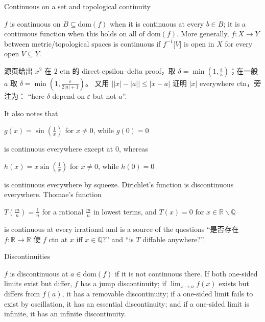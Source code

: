 \begin{definition}{Continuous on a set and topological continuity}

\(f\) is continuous on \(B \subseteq \text{dom}(f)\) when it is continuous at every \(b \in B\); it is a continuous function when this holds on all of \(\text{dom}(f)\). More generally, \(f:X\rightarrow Y\) between metric/topological spaces is continuous if \(f^{- 1}\lbrack V\rbrack\) is open in \(X\) for every open \(V \subseteq Y\).

\end{definition}

源页给出 \(x^{2}\) 在 \(2\) ctn 的 direct epsilon--delta proof，取 \(\delta = \min\left( {1,\frac{\varepsilon}{5}} \right)\)；在一般 \(a\) 取 \(\delta = \min\left( {1,\frac{\varepsilon}{2|a| + 1}} \right)\)。 又用 \(\left| {|x| - |a|} \right| \leq \left| {x - a} \right|\) 证明 \(|x|\) everywhere ctn，旁注为： ``here \(\delta\) depend on \(\varepsilon\) but not \(a\)''.

It also notes that

\(g(x) = \sin\left( \frac{1}{x} \right)\) for \(x \neq 0\), while \(g(0) = 0\)

is continuous everywhere except at \(0\), whereas

\(h(x) = x\sin\left( \frac{1}{x} \right)\) for \(x \neq 0\), while \(h(0) = 0\)

is continuous everywhere by squeeze. Dirichlet's function is discontinuous everywhere. Thomae's function

\(T\left( \frac{m}{n} \right) = \frac{1}{n}\) for a rational \(\frac{m}{n}\) in lowest terms, and \(T(x) = 0\) for \(x \in \mathbb{R} \smallsetminus \mathbb{Q}\)

is continuous at every irrational and is a source of the questions ``是否存在 \(f:\mathbb{R}\rightarrow\mathbb{R}\) 使 \(f\) ctn at \(x\) iff \(x \in \mathbb{Q}\)?'' and ``is \(T\) diffable anywhere?''.

\begin{definition}{Discontinuities}

\(f\) is discontinuous at \(a \in \text{dom}(f)\) if it is not continuous there. If both one-sided limits exist but differ, \(f\) has a jump discontinuity; if \(\lim_{x\rightarrow a}f(x)\) exists but differs from \(f(a)\), it has a removable discontinuity; if a one-sided limit fails to exist by oscillation, it has an essential discontinuity; and if a one-sided limit is infinite, it has an infinite discontinuity.

\end{definition}

